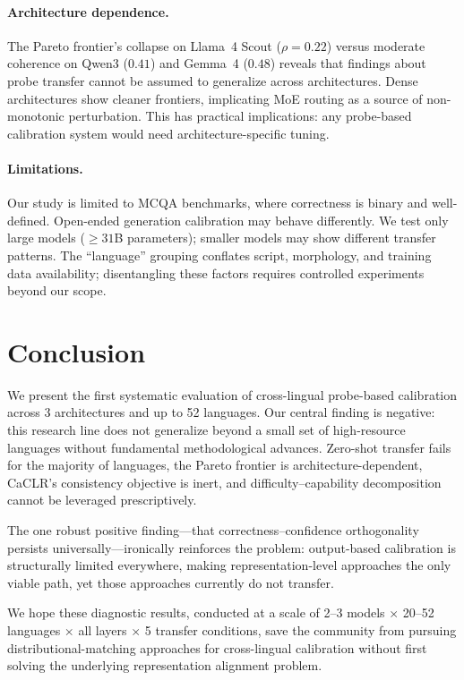 \documentclass[11pt,a4paper]{article}
\begin{document}
\paragraph{Architecture dependence.}
The Pareto frontier's collapse on Llama~4 Scout ($\rho{=}0.22$) versus moderate coherence on Qwen3 ($0.41$) and Gemma~4 ($0.48$) reveals that findings about probe transfer cannot be assumed to generalize across architectures.
Dense architectures show cleaner frontiers, implicating MoE routing as a source of non-monotonic perturbation.
This has practical implications: any probe-based calibration system would need architecture-specific tuning.

\paragraph{Limitations.}
Our study is limited to MCQA benchmarks, where correctness is binary and well-defined.
Open-ended generation calibration may behave differently.
We test only large models ($\geq 31$B parameters); smaller models may show different transfer patterns.
The ``language'' grouping conflates script, morphology, and training data availability; disentangling these factors requires controlled experiments beyond our scope.

\section{Conclusion}

We present the first systematic evaluation of cross-lingual probe-based calibration across 3 architectures and up to 52 languages.
Our central finding is negative: this research line does not generalize beyond a small set of high-resource languages without fundamental methodological advances.
Zero-shot transfer fails for the majority of languages, the Pareto frontier is architecture-dependent, CaCLR's consistency objective is inert, and difficulty--capability decomposition cannot be leveraged prescriptively.

The one robust positive finding---that correctness--confidence orthogonality persists universally---ironically reinforces the problem: output-based calibration is structurally limited everywhere, making representation-level approaches the only viable path, yet those approaches currently do not transfer.

We hope these diagnostic results, conducted at a scale of 2--3 models $\times$ 20--52 languages $\times$ all layers $\times$ 5 transfer conditions, save the community from pursuing distributional-matching approaches for cross-lingual calibration without first solving the underlying representation alignment problem.
\end{document}
